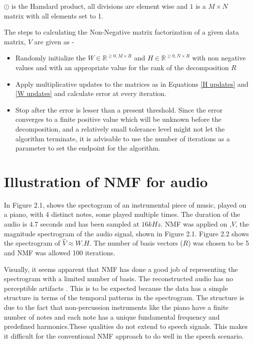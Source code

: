 $ \odot $ is the Hamdard product, all divisions are element wise and $1$ is a $M \times N$ matrix with all elements set to 1.

The steps to calculating the Non-Negative matrix factorization of a given data matrix, $V$ are given as -
\begin{itemize}
\item Randomly initialize the $W \in \mathbb{R}^{\geq 0, M \times R}$ and $H \in \mathbb{R}^{\geq 0, N \times R}$ with non negative values and with an appropriate value for the rank of the decomposition $R$
\item Apply multiplicative updates to the matrices as in Equations \ref{H updates} and \ref{W updates}  and calculate error at every iteration.
\item Stop after the error is lesser than a present threshold. Since the error converges to a finite positive value which will be unknown before the decomposition, and a relatively small tolerance level might not let the algorithm terminate,  it is advisable to use the number of iterations as a parameter to set the endpoint for the algorithm. 
\end{itemize}


\section{Illustration of NMF for audio}
In Figure 2.1, shows the spectogram of an instrumental piece of music, played on a piano, with 4 distinct notes, some played multiple  times. The duration of the audio is 4.7 seconds and has been sampled at $16kHz$. NMF was applied on ,$V$, the magnitude spectrogram of the audio signal, shown in Figure 2.1. Figure 2.2 shows the spectrogram of $\hat{V} \approx W.H$. The number of basis vectors ($R$) was chosen to be 5 and NMF was allowed 100 iterations.

Visually, it seems apparent that NMF has done a good job of representing the spectrogram with a limited number of basis. The reconstructed audio has no perceptible artifacts \cite{A}.  This is to be expected because the data has a simple structure in terms of the temporal patterns in the spectrogram. The structure is due to the fact that non-percussion instruments like the piano have a finite number of notes and each note has a unique fundamental frequency and predefined harmonics.These qualities do not extend to speech signals. This makes it difficult for the conventional NMF approach to do well in the speech scenario.

